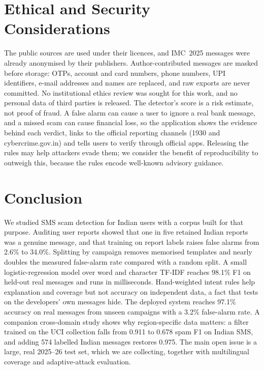 \documentclass[conference]{IEEEtran}
\begin{document}
\section{Ethical and Security Considerations}

The public sources are used under their licences, and IMC~2025 messages were already anonymised by their publishers. Author-contributed messages are masked before storage: OTPs, account and card numbers, phone numbers, UPI identifiers, e-mail addresses and names are replaced, and raw exports are never committed. No institutional ethics review was sought for this work, and no personal data of third parties is released. The detector's score is a risk estimate, not proof of fraud. A false alarm can cause a user to ignore a real bank message, and a missed scam can cause financial loss, so the application shows the evidence behind each verdict, links to the official reporting channels (1930 and cybercrime.gov.in) and tells users to verify through official apps. Releasing the rules may help attackers evade them; we consider the benefit of reproducibility to outweigh this, because the rules encode well-known advisory guidance.

\section{Conclusion}
\label{sec:conclusion}

We studied SMS scam detection for Indian users with a corpus built for that purpose. Auditing user reports showed that one in five retained Indian reports was a genuine message, and that training on report labels raises false alarms from 2.6\% to 34.0\%. Splitting by campaign removes memorised templates and nearly doubles the measured false-alarm rate compared with a random split. A small logistic-regression model over word and character TF-IDF reaches 98.1\% F1 on held-out real messages and runs in milliseconds. Hand-weighted intent rules help explanation and coverage but not accuracy on independent data, a fact that tests on the developers' own messages hide. The deployed system reaches 97.1\% accuracy on real messages from unseen campaigns with a 3.2\% false-alarm rate. A companion cross-domain study shows why region-specific data matters: a filter trained on the UCI collection falls from 0.911 to 0.678 spam F1 on Indian SMS, and adding 574 labelled Indian messages restores 0.975. The main open issue is a large, real 2025--26 test set, which we are collecting, together with multilingual coverage and adaptive-attack evaluation.
\end{document}
